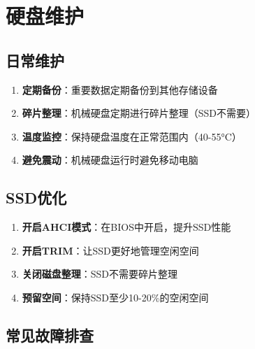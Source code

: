 \documentclass[12pt,UTF8]{ctexbook}
\begin{document}
\chapter{硬盘维护}

\section{日常维护}

\begin{enumerate}
    \item \textbf{定期备份}：重要数据定期备份到其他存储设备
    \item \textbf{碎片整理}：机械硬盘定期进行碎片整理（SSD不需要）
    \item \textbf{温度监控}：保持硬盘温度在正常范围内（40-55°C）
    \item \textbf{避免震动}：机械硬盘运行时避免移动电脑
\end{enumerate}

\section{SSD优化}

\begin{enumerate}
    \item \textbf{开启AHCI模式}：在BIOS中开启，提升SSD性能
    \item \textbf{开启TRIM}：让SSD更好地管理空闲空间
    \item \textbf{关闭磁盘整理}：SSD不需要碎片整理
    \item \textbf{预留空间}：保持SSD至少10-20\%的空闲空间
\end{enumerate}

\section{常见故障排查}
\end{document}
